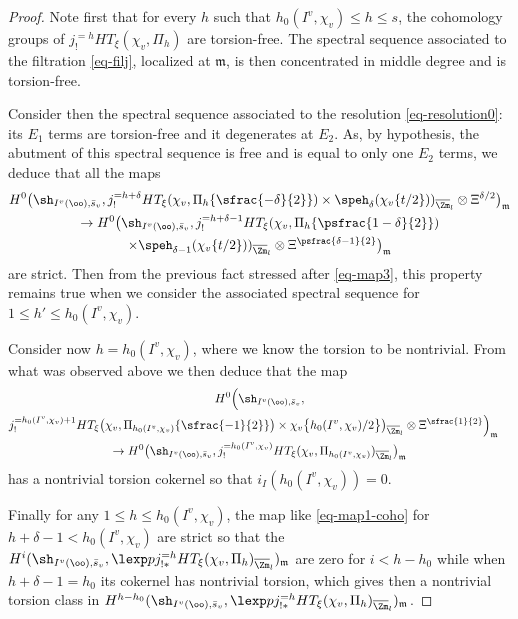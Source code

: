 \begin{proof}
Note first that for every $h$ such that $h_0(I^v,\chi_v) \leq h \leq s$, the cohomology groups of
$j^{=h}_! HT_\xi(\chi_{v},\Pi_h)$ are torsion-free.
The spectral sequence associated to the filtration
\eqref{eq-filj}, localized at $\mathfrak m$, is then concentrated in
middle degree and is torsion-free.

Consider then the spectral sequence associated to the resolution \eqref{eq-resolution0}: its
$E_1$ terms are torsion-free and it degenerates at $E_2$.
As, by hypothesis, the abutment of this spectral sequence is free
and is equal to only one $E_2$ terms, we deduce that all the maps
\begin{multline} \label{eq-map1-coho0}
H^0 \bigl (\sh_{I^{v}(\oo),\bar s_v},j_!^{=h+\delta} HT_\xi(\chi_{v},\Pi_h \{\sfrac{-\delta}{2}\}) \times
\speh_{\delta} (\chi_{v}\{t/2\}))_{\overline \Zm_l} \otimes \Xi^{\delta/2} \bigr)_{\mathfrak m}\\
\to H^0 \bigl (\sh_{I^{v}(\oo),\bar s_v},
j_!^{=h+\delta-1} HT_\xi(\chi_{v},\Pi_h \{\psfrac{1-\delta}{2}\}) \\ \times
\speh_{\delta-1}(\chi_{v}\{t/2\}))_{\overline \Zm_l} \otimes \Xi^{\psfrac{\delta-1}{2}} \bigr)_{\mathfrak m}
\end{multline}
are strict. Then from the previous fact stressed after \eqref{eq-map3}, this property
remains true when we consider the associated spectral sequence for $1 \leq h' \leq h_0(I^v,\chi_v)$.

Consider now $h=h_0(I^v,\chi_v)$,
where we know the torsion to be nontrivial. From what was observed above
we then deduce that the map
\begin{multline} \label{eq-map1-coho}
H^0 \Bigl (\sh_{I^{v}(\oo),\bar s_v},\\
\shoveright{j_!^{=h_0(I^v,\chi_v)+1} HT_\xi\bigl(\chi_{v},\Pi_{h_0(I^v,\chi_v)} \{\sfrac{-1}{2}\}\bigr)
\times \chi_{v}\bigl\{h_0(I^v,\chi_v)/2\bigl\}\bigr)_{\overline \Zm_l} \otimes \Xi^{\sfrac{1}{2}} \Bigr)_{\mathfrak m}} \\
\to H^0 \bigl (\sh_{I^{v}(\oo),\bar s_v},
j_!^{=h_0(I^v,\chi_v)} HT_\xi(\chi_{v},\Pi_{h_0(I^v,\chi_v)})_{\overline \Zm_l} \bigr)_{\mathfrak m}
\end{multline}
has a nontrivial torsion cokernel so that $i_I(h_0(I^v,\chi_v))=0$.

Finally for any $1 \leq h \leq h_0(I^v,\chi_v)$, the map like \eqref{eq-map1-coho} for $h+\delta-1 < h_0(I^v,\chi_v)$
are strict so that the $H^i(\sh_{I^{v}(\oo),\bar s_v},\lexp p j^{=h}_{!*}
HT_\xi(\chi_{v},\Pi_h)_{\overline \Zm_l})_{\mathfrak m}$ are zero for $i < h-h_0$ while when
$h+\delta-1=h_0$ its cokernel has nontrivial torsion, which gives
then a nontrivial torsion class in $H^{h-h_0}(\sh_{I^{v}(\oo),\bar s_v},\lexp p j^{=h}_{!*}
HT_\xi(\chi_{v},\Pi_h)_{\overline \Zm_l})_{\mathfrak m}$.
\end{proof}

